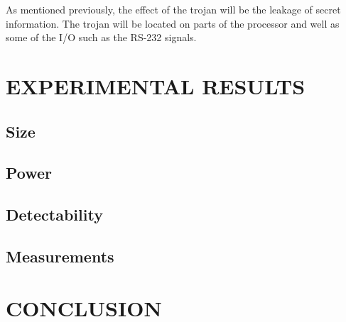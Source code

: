 \documentclass[letterpaper, 10 pt, conference]{ieeeconf}  %
\begin{document}
As mentioned previously, the effect of the trojan will be the leakage of secret information.  The trojan will be located on parts of the processor and well as some of the I/O such as the RS-232 signals.
  
\section{EXPERIMENTAL RESULTS}

\subsection{Size}

\subsection{Power}

\subsection{Detectability}

\subsection{Measurements} 

\section{CONCLUSION}


\addtolength{\textheight}{-12cm}   %







\end{document}
